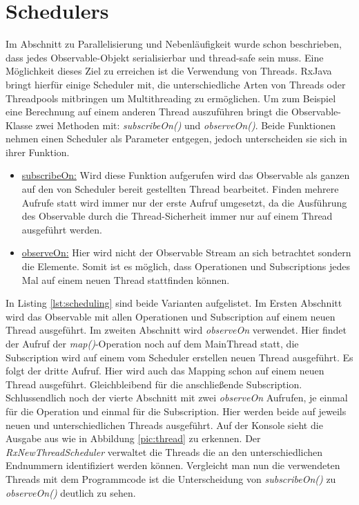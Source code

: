 \section{Schedulers}
Im Abschnitt zu Parallelisierung und Nebenläufigkeit wurde schon beschrieben, dass jedes Observable-Objekt serialisierbar und thread-safe sein muss. Eine Möglichkeit dieses Ziel zu erreichen ist die Verwendung von Threads. RxJava bringt hierfür einige Scheduler mit, die unterschiedliche Arten von Threads oder Threadpools mitbringen um Multithreading zu ermöglichen. Um zum Beispiel eine Berechnung auf einem anderen Thread auszuführen bringt die Observable-Klasse zwei Methoden mit: \textit{subscribeOn()} und \textit{observeOn()}. Beide Funktionen nehmen einen Scheduler als Parameter entgegen, jedoch unterscheiden sie sich in ihrer Funktion. 
\begin{itemize}
\item \underline{subscribeOn:} Wird diese Funktion aufgerufen wird das Observable als ganzen auf den von Scheduler bereit gestellten Thread bearbeitet. Finden mehrere Aufrufe statt wird immer nur der erste Aufruf umgesetzt, da die Ausführung des Observable durch die Thread-Sicherheit immer nur auf einem Thread ausgeführt werden. 
\item \underline{observeOn:} Hier wird nicht der Observable Stream an sich betrachtet sondern die Elemente. Somit ist es möglich, dass Operationen und Subscriptions jedes Mal auf einem neuen Thread stattfinden können.
\end{itemize}

In Listing \ref{lst:scheduling} sind beide Varianten aufgelistet. Im Ersten Abschnitt wird das Observable mit allen Operationen und Subscription auf einem neuen Thread ausgeführt. Im zweiten Abschnitt wird \textit{observeOn} verwendet. Hier findet der Aufruf der \textit{map()}-Operation noch auf dem MainThread statt, die Subscription wird auf einem vom Scheduler erstellen neuen Thread ausgeführt. Es folgt der dritte Aufruf. Hier wird auch das Mapping schon auf einem neuen Thread ausgeführt. Gleichbleibend für die anschließende Subscription. Schlussendlich noch der vierte Abschnitt mit zwei \textit{observeOn} Aufrufen, je einmal für die Operation und einmal für die Subscription. Hier werden beide auf jeweils neuen und unterschiedlichen Threads ausgeführt. Auf der Konsole sieht die Ausgabe aus wie in Abbildung \ref{pic:thread} zu erkennen. Der \textit{RxNewThreadScheduler} verwaltet die Threads die an den unterschiedlichen Endnummern identifiziert werden können. Vergleicht man nun die verwendeten Threads mit dem Programmcode ist die Unterscheidung von \textit{subscribeOn()} zu \textit{observeOn()} deutlich zu sehen.

